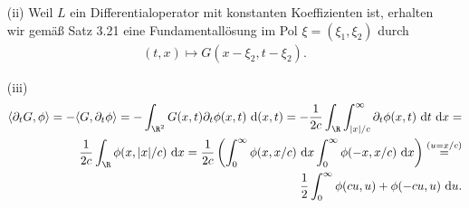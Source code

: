 \begin{solution}
\begin{itemize}
\item[(ii)] Weil $L$ ein Differentialoperator mit konstanten Koeffizienten ist, erhalten wir gemäß Satz 3.21 eine Fundamentallösung im Pol $\xi = (\xi_1, \xi_2)$ durch
\begin{align*}
(t, x) \mapsto G(x - \xi_2, t - \xi_2).
\end{align*}

\item[(iii)]
\begin{align*}
    \langle \partial_t G, \phi \rangle = - \langle G, \partial_t \phi \rangle =
    - \int_{\R^2} G(x, t) \partial_t \phi(x, t) \mathrm{~d}(x, t) =
    - \frac{1}{2c} \int_\R \int_{|x|/c}^\infty \partial_t \phi(x, t)    \mathrm{~d}t \mathrm{~d}x = \\
    \frac{1}{2c} \int_\R \phi(x, |x|/c) \mathrm{~d}x =
    \frac{1}{2c} \left( \int_0^\infty \phi(x, x/c) \mathrm{~d}x \int_0^\infty \phi(-x, x/c) \mathrm{~d}x \right) \stackrel{(u = x/c)}{~=~} \\
    \frac{1}{2} \int_0^\infty \phi(cu, u) + \phi(-cu, u) \mathrm{~d}u.
\end{align*}

\end{itemize}

\end{solution}

